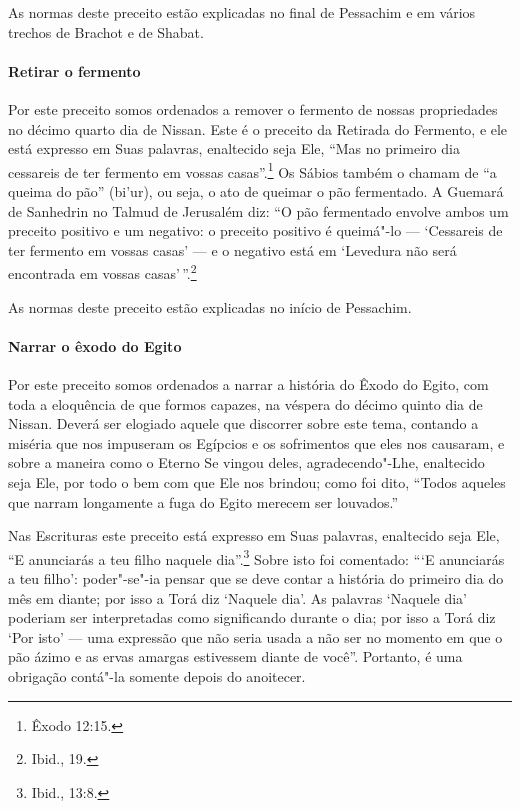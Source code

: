 \begin{multicols}{2}
As normas deste preceito estão explicadas no final de Pessachim\starr{} e em
vários trechos de Brachot\starr{} e de Shabat.

\paragraph{Retirar o fermento}

Por este preceito somos ordenados a remover o fermento de nossas
propriedades no décimo quarto dia de Nissan\starr. Este é o preceito da
Retirada do Fermento, e ele está expresso em Suas palavras, enaltecido seja Ele,
``Mas no primeiro dia cessareis de ter fermento em vossas casas''.\footnote{Êxodo 12:15.}
Os Sábios também o chamam de ``a queima do pão'' (bi'ur), ou seja, o ato
de queimar o pão fermentado. A Guemará\starr{} de Sanhedrin\starr{} no Talmud\starr{} de
Jerusalém diz: ``O pão fermentado envolve ambos um preceito positivo e um negativo: o
preceito positivo é queimá"-lo --- `Cessareis de ter fermento em vossas
casas' --- e o negativo está em `Levedura não será encontrada em vossas casas'\,''.\footnote{Ibid., 19.}

As normas deste preceito estão explicadas no início de Pessachim\starr.

\paragraph{Narrar o êxodo do Egito}

Por este preceito somos ordenados a narrar a história do Êxodo do Egito,
com toda a eloquência de que formos capazes, na véspera do décimo quinto
dia de Nissan\starr. Deverá ser elogiado aquele que discorrer sobre este tema,
contando a miséria que nos impuseram os Egípcios e os sofrimentos que
eles nos causaram, e sobre a maneira como o Eterno Se vingou deles,
agradecendo"-Lhe, enaltecido seja Ele, por todo o bem com que Ele nos
brindou; como foi dito, ``Todos aqueles que narram longamente a fuga do
Egito merecem ser louvados.''

Nas Escrituras este preceito está expresso em Suas palavras, enaltecido
seja Ele, ``E anunciarás a teu filho naquele dia''.\footnote{Ibid., 13:8.} Sobre
isto foi comentado: ```E anunciarás a teu filho': poder"-se"-ia pensar que
se deve contar a história do primeiro dia do mês em diante; por isso a
Torá\starr{} diz `Naquele dia'. As palavras `Naquele dia' poderiam ser
interpretadas como significando durante o dia; por isso a Torá\starr{} diz
`Por isto' --- uma expressão que não seria usada a não ser no momento em
que o pão ázimo e as ervas amargas estivessem diante de você''.
Portanto, é uma obrigação contá"-la somente depois do anoitecer.


\end{multicols}
